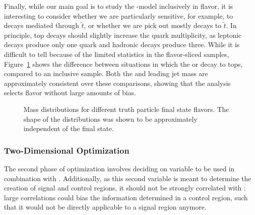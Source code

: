 
Finally, while our main goal is to study the \gluino-\lsp model inclusively in flavor, it is interesting to consider whether we are particularly sensitive, for example, to \gluino decays mediated through $\tilde{t}$, or whether we are pick out mostly \lsp decays to $\tilde{t}$. In principle, top decays should slightly increase the quark multiplicity, as leptonic decays produce only one quark and hadronic decays produce three. While it is difficult to tell because of the limited statistics in the flavor-sliced samples, Figure~\ref{fig:search:search:optimization:flavor} shows the difference between situations in which the \gluino or \lsp decay to tops, compared to an inclusive sample. Both the \MJ and leading jet mass are approximately consistent over these comparisons, showing that the analysis selects flavor without large amounts of bias.


\begin{figure}[!ht]
  \centering

  
    \caption{Mass distributions for different truth particle final state flavors. The shape of the distributions was shown to be approximately independent of the final state.}
  \label{fig:search:search:optimization:flavor}
\end{figure}

\subsubsection{Two-Dimensional Optimization}

The second phase of optimization involves deciding on variable to be used in combination with \MJ. Additionally, as this second variable is meant to determine the creation of signal and control regions, it should not be strongly correlated with \MJ: large correlations could bias the information determined in a control region, such that it would not be directly applicable to a signal region anymore.

